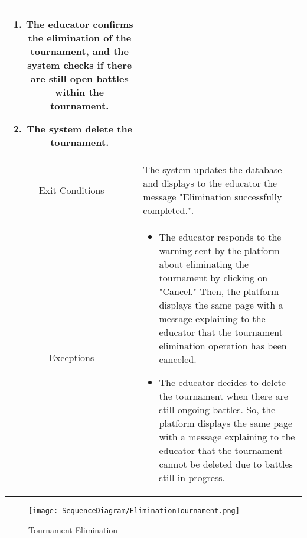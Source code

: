 \begin{longtable}{|c| p{10cm}|}
\begin{enumerate}
                            \item The educator confirms the elimination of the tournament, and the system checks if there are still open battles within the tournament.
                            \item The system delete the tournament.
                            \end{enumerate} \\
                            \hline
            Exit Conditions &
            The system updates the database and displays to the educator the message "Elimination successfully completed.".
            \\
        \hline
         Exceptions &\begin{itemize}
             \item The educator responds to the warning sent by the platform about eliminating the tournament by clicking on "Cancel." Then, the platform displays the same page with a message explaining to the educator that the tournament elimination operation has been canceled.
             \item The educator decides to delete the tournament when there are still ongoing battles. So, the platform displays the same page with a message explaining to the educator that the tournament cannot be deleted due to battles still in progress.
         \end{itemize} \\
             \hline
         
            
    \end{longtable}

        \begin{figure}[H]
  \texttt{[image: SequenceDiagram/EliminationTournament.png]} 
  \caption{Tournament Elimination}
  \label{fig:immagine}
\end{figure}
